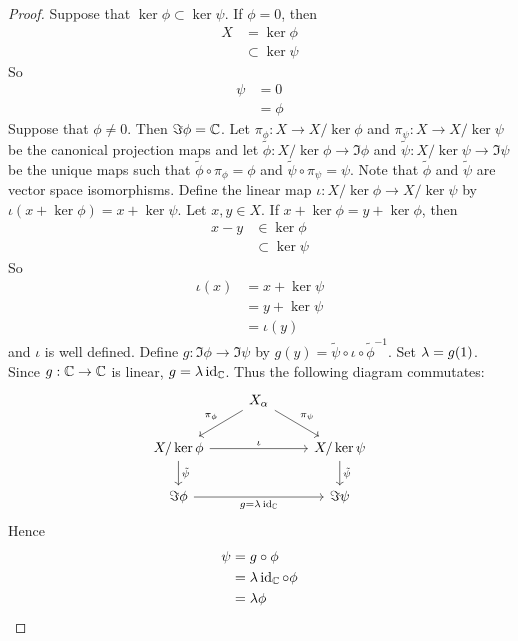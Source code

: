 \documentclass{book}
\begin{document}
	\begin{proof}
		Suppose that $\ker  \phi \subset \ker \psi$. If $\phi = 0$, then 
		\begin{align*}
			X 
			& = \ker \phi\\
			& \subset \ker \psi 
		\end{align*}
		So 
		\begin{align*}
			\psi 
			& = 0 \\
			& = \phi
		\end{align*}
		Suppose that $\phi \neq 0$. Then $\Im \phi = \mathbb{C}$. Let $\pi_{\phi}: X \rightarrow X / \ker \phi$ and $\pi_{\psi}: X \rightarrow X / \ker \psi$ be the canonical projection maps and let $\tilde{\phi}: X / \ker \phi \rightarrow \Im \phi$ and $\tilde{\psi}:X / \ker \psi \rightarrow \Im \psi$ be the unique maps such that $\tilde{\phi} \circ \pi_{\phi} = \phi$ and $\tilde{\psi} \circ \pi_{\psi} = \psi$. Note that $\tilde{\phi}$ and $\tilde{\psi}$ are vector space isomorphisms. Define the linear map $\iota: X /\ker \phi \rightarrow X / \ker \psi$ by $\iota(x + \ker \phi) = x + \ker \psi$. Let $x,y \in X$. If $x + \ker \phi = y + \ker \phi$, then 
		\begin{align*}
			x -y 
			& \in \ker \phi \\
			& \subset \ker \psi 
		\end{align*}
		So 
		\begin{align*}
			\iota(x) 
			& = x + \ker \psi \\
			& = y + \ker \psi \\
			& = \iota(y)
		\end{align*}
		and $\iota$ is well defined. Define $g: \Im \phi \rightarrow \Im \psi$ by $g(y) = \tilde{\psi} \circ \iota \circ \tilde{\phi}^{-1}$. Set $\lambda = g(1)$. Since $g: \mathbb{C} \rightarrow \mathbb{C}$ is linear, $g = \lambda \operatorname{id}_{\mathbb{C}}$. Thus the following diagram commutates: 
		\[ 
		\begin{tikzcd}
			& X_{\al} \arrow[dr, "\pi_{\psi}"] \arrow[dl, "\pi_{\phi}"'] &  \\
			X / \ker \phi \arrow[rr, "\iota"] \arrow[d, "\tilde{\psi}"] & & X / \ker \psi  \arrow[d, "\tilde{\psi}"] \\
			\Im \phi \arrow[rr, "g = \lam \id_{\C}"'] & & \Im \psi
		\end{tikzcd}
		\]
		Hence 
		\begin{align*}
			\psi
			& = g \circ \phi \\
			& = \lambda \operatorname{id}_{\mathbb{C}} \circ \phi \\
			& = \lambda \phi
		\end{align*} 
	\end{proof}
\end{document}
